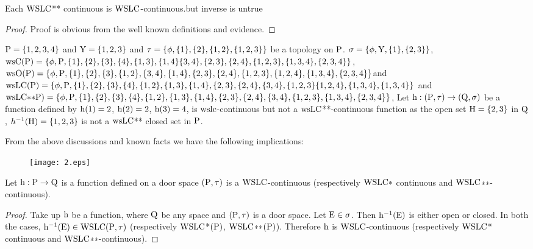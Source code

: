 \begin{thm}\label{thm6.3.11}
Each $\mathrm{WSLC}${*}{*} continuous is $\mathrm{WSLC}$-continuous.but inverse is untrue
\end{thm}

\begin{proof}
Proof is obvious from the well known definitions and evidence.
\end{proof}

\begin{exm}\label{exam6.3.12}
$\mathrm{P} = \{1,2,3,4\}$ and $\mathrm{Y}= \{1,2,3\}$ and $\tau = \{\phi, \{1\},\{2\}, \{1,2\},\break \{1,2,3\}\}$ be a topology on $\mathrm{P}$. $\sigma = \{\phi, \mathrm{Y}, \{1\},\{ 2, 3\}\}$, $\ws\TSC(\TSP) = \{\phi, \TSP,\{1\}, \{2\}, \{3\},\break \{4\}, \{1,3\}, \{1, 4\} \{3,4\}, \{2,3\}, \{2,4\}, \{1,2, 3\},\{1,3,4\},\{2,3,4\}\}$, $\ws\TSO(\TSP) = \{\phi, \TSP,\break \{1\}, \{2\}, \{3\},\{1,2\}, \{3,4\}, \{1,4\}, \{2,3\}, \{2,4\}, \{1,2,3\}, \{1,2,4\},\{1,3,4\},\{2,3,4\}\}$\break and $\ws\LC(\TSP)= \{\phi, \TSP ,\{1\}, \{2\}, \{3\},\{4\},\{1,2\},\{1,3\}, \{1,4\}, \{2,3\}, \{2,4\},\{3,4\},\break \{1,2,3\}\{1,2,4\},\{1,3,4\},\{1,3,4\}\}$ and $\ws\LC{*}{*}\TSP)= \{\phi, \TSP,\{1\}, \{2\}, \{3\},\{4\},\{1,2\},\break \{1,3\}, \{1,4\}, \{2,3\}, \{2,4\},\{3,4\}, \{1, 2, 3\},\{1,3,4\},\{2,3,4\}\}$, Let $\mathrm{h}: (\mathrm{P}, \tau )\to(\mathrm{Q}, \sigma)$ be a function defined by $\mathrm{h}(1)= 2$, $\mathrm{h}(2)=2$, $\mathrm{h}(3)=4$, is $\mathrm{ws}\mathrm{lc}$-continuous but not a $\mathrm{ws}\mathrm{LC}${*}{*}-continuous function as the open set $\mathrm{H}=\{2,3\}$ in $\mathrm{Q}$, $h^{-1} (\mathrm{H})=\{1,2,3\}$ is not a $\mathrm{ws}\mathrm{LC}${*}{*} closed set in $\mathrm{P}$.
\end{exm}

\begin{rem}\label{rem6.2.13}
From the above discussions and known facts we have the following implications:
\begin{figure}[H]
\centering
\texttt{[image: 2.eps]}
\end{figure}
\end{rem}

\begin{thm}\label{thm6.3.14}
Let $\mathrm{h}: \mathrm{P} \to \mathrm{Q}$ is a function defined on a door space $(\mathrm{P},\tau)$ is a $\mathrm{WSLC}$-continuous (respectively $\mathrm{WSLC}*$ continuous and $\mathrm{WSLC}${∗}{∗}-continuous).
\end{thm}

\begin{proof}
Take up $\mathrm{h}$ be a function, where $\mathrm{Q}$ be any space and $(\mathrm{P}, \tau)$ is a door space. Let $\mathrm{E} \in \sigma$. Then $\mathrm{h}^{-1} (\mathrm{E})$ is either open or closed. In both the cases, $\mathrm{h}^{-1} (\mathrm{E}) \in \mathrm{WSLC}(\mathrm{P}, \tau)$ (respectively $\mathrm{WSLC}$*$(\mathrm{P})$, $\mathrm{WSLC}${∗}{∗}$(\mathrm{P})$). Therefore $\mathrm{h}$ is $\mathrm{WSLC}$-continuous (respectively $\mathrm{WSLC}$* continuous and $\mathrm{WSLC}${∗}{∗}-continuous).
\end{proof}

